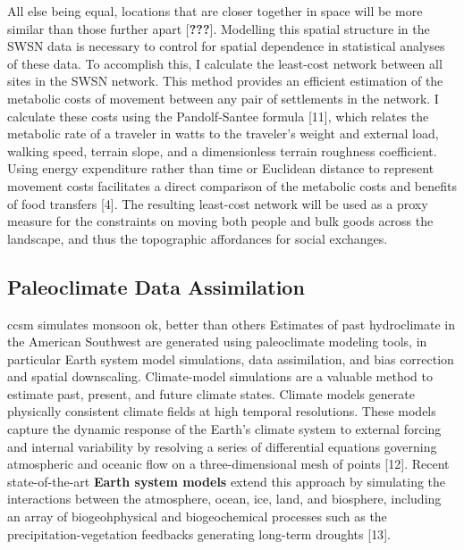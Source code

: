 \documentclass[10pt,letterpaper]{article}
\begin{document}
All else being equal, locations that are closer together in space will
be more similar than those further apart {[}{\textbf{???}}{]}. Modelling
this spatial structure in the SWSN data is necessary to control for
spatial dependence in statistical analyses of these data. To accomplish
this, I calculate the least-cost network between all sites in the SWSN
network. This method provides an efficient estimation of the metabolic
costs of movement between any pair of settlements in the network. I
calculate these costs using the Pandolf-Santee formula {[}11{]}, which
relates the metabolic rate of a traveler in watts to the traveler's
weight and external load, walking speed, terrain slope, and a
dimensionless terrain roughness coefficient. Using energy expenditure
rather than time or Euclidean distance to represent movement costs
facilitates a direct comparison of the metabolic costs and benefits of
food transfers {[}4{]}. The resulting least-cost network will be used as
a proxy measure for the constraints on moving both people and bulk goods
across the landscape, and thus the topographic affordances for social
exchanges.

\subsection{Paleoclimate Data
Assimilation}\label{paleoclimate-data-assimilation}

ccsm simulates monsoon ok, better than others Estimates of past
hydroclimate in the American Southwest are generated using paleoclimate
modeling tools, in particular Earth system model simulations, data
assimilation, and bias correction and spatial downscaling. Climate-model
simulations are a valuable method to estimate past, present, and future
climate states. Climate models generate physically consistent climate
fields at high temporal resolutions. These models capture the dynamic
response of the Earth's climate system to external forcing and internal
variability by resolving a series of differential equations governing
atmospheric and oceanic flow on a three-dimensional mesh of points
{[}12{]}. Recent state-of-the-art \textbf{Earth system models} extend
this approach by simulating the interactions between the atmosphere,
ocean, ice, land, and biosphere, including an array of biogeohphysical
and biogeochemical processes such as the precipitation-vegetation
feedbacks generating long-term droughts {[}13{]}.
\end{document}
